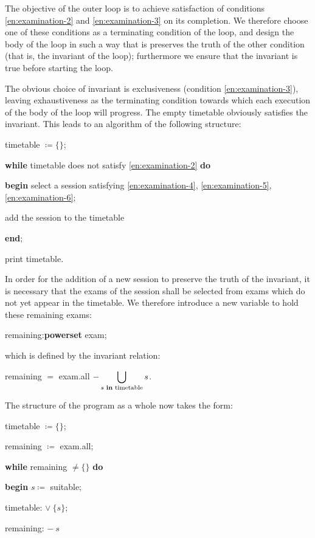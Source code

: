 The objective of the outer loop is to achieve satisfaction of conditions \ref{en:examination-2} and \ref{en:examination-3} on its completion. We therefore choose one of these conditions as a terminating condition of the loop, and design the body of the loop in such a way that is preserves the truth of the other condition (that is, the invariant of the loop); furthermore we ensure that the invariant is true before starting the loop.

The obvious choice of invariant is exclusiveness (condition \ref{en:examination-3}), leaving exhaustiveness as the terminating condition towards which each execution of the body of the loop will progress. The empty timetable obviously satisfies the invariant. This leads to an algorithm of the following structure:

\quad timetable $\coloneq \{\}$;

\quad \textbf{while} timetable does not satisfy \ref{en:examination-2} \textbf{do}

\quad \textbf{begin} select a session satisfying \ref{en:examination-4}, \ref{en:examination-5}, \ref{en:examination-6};

\quad \quad add the session to the timetable

\quad \textbf{end};

\quad print timetable.

In order for the addition of a new session to preserve the truth of the
invariant, it is necessary that the exams of the session shall be selected from
exams which do not yet appear in the timetable. We therefore introduce a
new variable to hold these remaining exams:

\quad remaining:\textbf{powerset} exam;

\noindent
which is defined by the invariant relation:

\quad remaining $=$ exam.all $- \displaystyle\bigcup_{s \text{ \textbf{in} timetable}} s$.

\noindent
The structure of the program as a whole now takes the form:

\quad timetable $\coloneq \{\}$;

\quad remaining $\coloneq$ exam.all;

\quad \textbf{while} remaining $\neq \{\}$ \textbf{do}

\quad \quad \textbf{begin} $s\coloneq$ suitable;

\quad \quad \quad timetable: $\vee\ \{s\}$;

\quad \quad \quad remaining: $-\ s$

